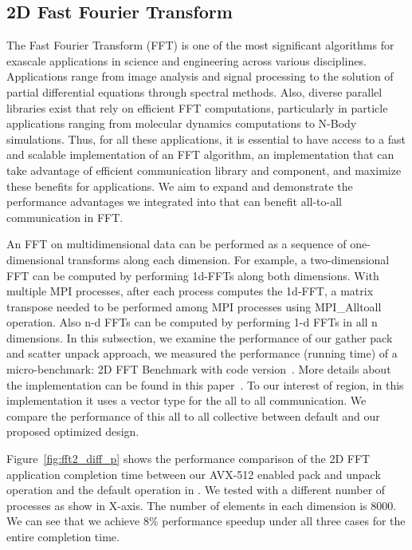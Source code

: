 \documentclass[conference]{IEEEtran}
\begin{document}
\subsection{2D Fast Fourier Transform}\label{sec:FFTs}
The Fast Fourier Transform (FFT) is one of the most significant algorithms for exascale applications in science and engineering across various disciplines. Applications range from image analysis
and signal processing to the solution of partial differential equations through spectral methods.
Also, diverse parallel libraries exist that rely on efficient FFT computations, particularly in particle applications ranging from molecular dynamics computations to N-Body simulations. Thus, for all these applications, it is essential to have
access to a fast and scalable implementation of an FFT
algorithm, an implementation that can take advantage of efficient communication
library and component, and maximize these benefits for applications.
We aim to expand and demonstrate the performance advantages we integrated into \ompi that can benefit all-to-all
communication in FFT.

An FFT on multidimensional data can be performed as a sequence
of one-dimensional transforms along each dimension.
For example, a two-dimensional FFT can be computed by performing 1d-FFTs along both dimensions.
With multiple MPI processes, after each process computes the 1d-FFT, a matrix transpose needed to be performed
among MPI processes using MPI\_Alltoall operation. Also n-d FFTs can be computed
by performing 1-d FFTs in all n dimensions.
In this subsection, we examine the performance of our gather pack and scatter unpack approach,
we measured the performance (running time) of a micro-benchmark: 2D FFT Benchmark with code version~\cite{2dfft}.
More details about the implementation can be found in this paper~\cite{ddtHoefler}. To our interest of region, in this implementation it uses a vector type for the all to all communication.
We compare the performance of this all to all collective between \mpi default and our proposed optimized design.

Figure~\ref{fig:fft2_diff_p} shows the performance comparison of the 2D FFT application completion time
between our AVX-512 enabled pack and unpack operation and the default operation in \ompi.
We tested with a different number of processes as show in X-axis. The number of elements in each dimension is 8000.
We can see that we achieve 8\% performance speedup under all three cases for the entire completion time.
\end{document}
